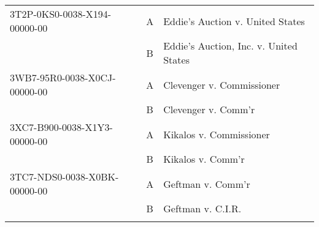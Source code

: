 \documentclass[10pt, letterpaper]{article}
\begin{document}
\begin{spacing}{1.0}
\begin{table}[H]
\begin{tabular}{lcl}
        3T2P-0KS0-0038-X194-00000-00 & A & Eddie's Auction v. United States\\ & B & Eddie's Auction, Inc. v. United States\\[6pt]
        3WB7-95R0-0038-X0CJ-00000-00 & A & Clevenger v. Commissioner\\ & B & Clevenger v. Comm'r\\[6pt]
        3XC7-B900-0038-X1Y3-00000-00 & A & Kikalos v. Commissioner\\ & B & Kikalos v. Comm'r\\[6pt]
        3TC7-NDS0-0038-X0BK-00000-00 & A & Geftman v. Comm'r\\ & B & Geftman v. C.I.R.\\[6pt]
        \hline\\
    \end{tabular}
    \label{tab:diffShortName}
\end{table}


\end{spacing}
\end{document}
